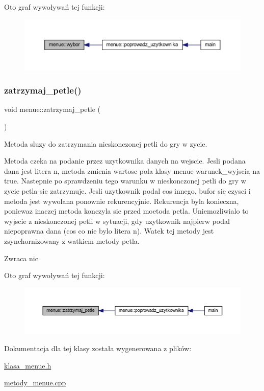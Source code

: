Oto graf wywoływań tej funkcji\+:
\nopagebreak
\begin{figure}[H]
\begin{center}
\leavevmode
\includegraphics[width=350pt]{classmenue_af6a59b2891dfcc8df337d3ac11fb767d_icgraph}
\end{center}
\end{figure}
\mbox{\label{classmenue_a361a3472705b073f0cc7ae3e93576f04}} 
\subsubsection{\texorpdfstring{zatrzymaj\+\_\+petle()}{zatrzymaj\_petle()}}
{\footnotesize\ttfamily void menue\+::zatrzymaj\+\_\+petle (\begin{DoxyParamCaption}{ }\end{DoxyParamCaption})\hspace{0.3cm}{\ttfamily [static]}}

Metoda sluzy do zatrzymania nieskonczonej petli do gry w zycie.

Metoda czeka na podanie przez uzytkownika danych na wejscie. Jesli podana dana jest litera n, metoda zmienia wartosc pola klasy menue warunek\+\_\+wyjscia na true. Nastepnie po sprawdzeniu tego warunku w nieskonczonej petli do gry w zycie petla sie zatrzymuje. Jesli uzytkownik podal cos innego, bufor sie czysci i metoda jest wywolana ponownie rekurencyjnie. Rekurencja byla konieczna, poniewaz inaczej metoda konczyla sie przed moetoda petla. Uniemozliwialo to wyjscie z nieskonczonej petli w sytuacji, gdy uzytkownik najpierw podal niepoprawna dana (cos co nie bylo litera n). Watek tej metody jest zsynchornizowany z watkiem metody petla. \begin{DoxyReturn}{Zwraca}
nic 
\end{DoxyReturn}
Oto graf wywoływań tej funkcji\+:
\nopagebreak
\begin{figure}[H]
\begin{center}
\leavevmode
\includegraphics[width=350pt]{classmenue_a361a3472705b073f0cc7ae3e93576f04_icgraph}
\end{center}
\end{figure}


Dokumentacja dla tej klasy została wygenerowana z plików\+:\begin{DoxyCompactItemize}
\item 
\mbox{\hyperlink{klasa__menue_8h}{klasa\+\_\+menue.\+h}}\item 
\mbox{\hyperlink{metody__menue_8cpp}{metody\+\_\+menue.\+cpp}}\end{DoxyCompactItemize}
